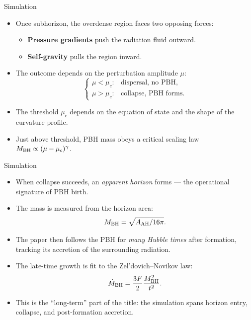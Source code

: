 \documentclass[aspectratio=169, 12pt]{beamer}
\begin{document}
\begin{frame}{Simulation}
	\vspace{0.5em}
	\begin{itemize}
		\item Once subhorizon, the overdense region faces two
		      opposing forces:
		      \begin{itemize}
		          \item \textbf{Pressure gradients} push the radiation
		                fluid outward.
		          \item \textbf{Self-gravity} pulls the region inward.
		      \end{itemize}
		\item The outcome depends on the perturbation amplitude
		      $\mu$:
		      \[
		          \begin{cases}
		              \mu < \mu_c: & \text{dispersal, no PBH}, \\[2pt]
		              \mu > \mu_c: & \text{collapse, PBH forms}.
		          \end{cases}
		      \]
		\item The threshold $\mu_c$ depends on the equation of state
		      and the shape of the curvature profile.
		\item Just above threshold, PBH mass obeys a critical
		      scaling law $M_{\rm BH} \propto (\mu - \mu_c)^{\gamma}$.
	\end{itemize}
\end{frame}
\begin{frame}{Simulation}
	\vspace{0.5em}
	\begin{itemize}
		\item When collapse succeeds, an \emph{apparent horizon}
		      forms — the operational signature of PBH birth.
		\item The mass is measured from the horizon area:
		      \[
		          M_{\rm BH} = \sqrt{A_{\rm AH} / 16\pi}.
		      \]
		\item The paper then follows the PBH for \emph{many Hubble
		      times} after formation, tracking its accretion of the
		      surrounding radiation.
		\item The late-time growth is fit to the
		      Zel'dovich--Novikov law:
		      \[
		          \dot{M}_{\rm BH} = \frac{3F}{2}\frac{M_{\rm BH}^2}{t^2}.
		      \]
		\item This is the ``long-term'' part of the title: the
		      simulation spans horizon entry, collapse, and
		      post-formation accretion.
	\end{itemize}
\end{frame}
\end{document}
